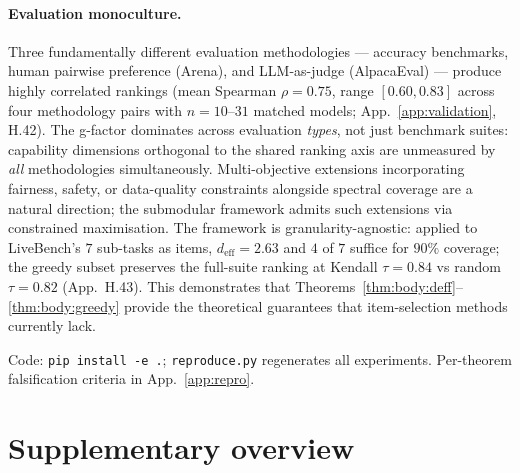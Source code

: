 \documentclass{article}
\begin{document}
\paragraph{Evaluation monoculture.}
Three fundamentally different evaluation methodologies ---
accuracy benchmarks, human pairwise preference (Arena), and
LLM-as-judge (AlpacaEval) --- produce highly correlated rankings
(mean Spearman $\rho = 0.75$, range $[0.60, 0.83]$ across four
methodology pairs with $n = 10$--$31$ matched models;
App.~\ref{app:validation}, H.42). The g-factor dominates across
evaluation \emph{types}, not just benchmark suites: capability
dimensions orthogonal to the shared ranking axis are unmeasured by
\emph{all} methodologies simultaneously.
Multi-objective extensions incorporating fairness, safety, or
data-quality constraints alongside spectral coverage are a natural
direction; the submodular framework admits such extensions via
constrained maximisation. The framework is granularity-agnostic:
applied to LiveBench's $7$ sub-tasks as items, $d_{\mathrm{eff}} =
2.63$ and $4$ of $7$ suffice for $90\%$ coverage; the greedy subset
preserves the full-suite ranking at Kendall $\tau = 0.84$ vs random
$\tau = 0.82$ (App.~H.43). This demonstrates that
Theorems~\ref{thm:body:deff}--\ref{thm:body:greedy} provide the
theoretical guarantees that item-selection methods
\citep{polo2024tinybenchmarks} currently lack.

\noindent Code: \texttt{pip install -e .}; \texttt{reproduce.py}
regenerates all experiments. Per-theorem falsification criteria in
App.~\ref{app:repro}.






\appendix

\section*{Supplementary overview}
\end{document}
